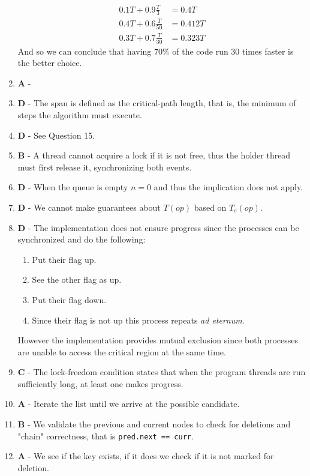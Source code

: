 \documentclass[a4paper,twocolumn]{article}
\begin{document}
\begin{enumerate}
\begin{equation*}
\begin{split}
            0.1 T + 0.9\frac{T}{3} & = 0.4T \\
            0.4 T + 0.6\frac{T}{50} & = 0.412T \\
            0.3 T + 0.7\frac{T}{30} & = 0.323T
        \end{split}
    \end{equation*}
    And so we can conclude that having $70\%$ of the code run 30 times faster is the better choice.
    \item \textbf{A} -
    \item \textbf{D} - The span is defined as the critical-path length, that is, the minimum of steps the algorithm must execute.
    \item \textbf{D} - See Question 15.
    \item \textbf{B} - A thread cannot acquire a lock if it is not free, thus the holder thread must first release it, synchronizing both events.
    \item \textbf{D} - When the queue is empty $n=0$ and thus the implication does not apply.
    \item \textbf{D} - We cannot make guarantees about $T(op)$ based on $T_e(op)$.
    \item \textbf{D} - The implementation does not ensure progress since the processes can be synchronized and do the following:
    \begin{enumerate}
        \item Put their flag up.
        \item See the other flag as up.
        \item Put their flag down.
        \item Since their flag is not up this process repeats \textit{ad eternum}.
    \end{enumerate}
    However the implementation provides mutual exclusion since both processes are unable to access the critical region at the same time.
    \item \textbf{C} - The lock-freedom condition states that when the program threads are run sufficiently long, at least one makes progress.
    \item \textbf{A} - Iterate the list until we arrive at the possible candidate.
    \item \textbf{B} - We validate the previous and current nodes to check for deletions and "chain" correctness, that is \texttt{pred.next == curr}.
    \item \textbf{A} - We see if the key exists, if it does we check if it is not marked for deletion.

\end{enumerate}
\end{document}
